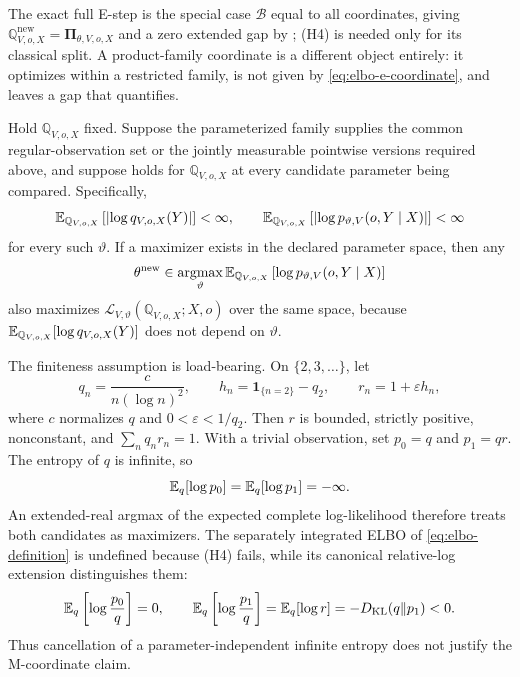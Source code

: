 The exact full E-step is the special case \(\mathcal B\) equal to all coordinates, giving \(\mathbb Q_{V,o,X}^{\mathrm{new}}=\boldsymbol\Pi_{\theta,V,o,X}\) and a zero extended gap by ; (H4) is needed only for its classical split. A product-family coordinate is a different object entirely: it optimizes within a restricted family, is not given by \eqref{eq:elbo-e-coordinate}, and leaves a gap that  quantifies.

Hold \(\mathbb Q_{V,o,X}\) fixed. Suppose the parameterized family supplies the common regular-observation set or the jointly measurable pointwise versions required above, and suppose  holds for \(\mathbb Q_{V,o,X}\) at every candidate parameter being compared. Specifically,
\[
\mathbb E_{\mathbb Q_{V,o,X}}\left[
\left|\log q_{V,o,X}(Y)\right|
\right]<\infty,
\qquad
\mathbb E_{\mathbb Q_{V,o,X}}\left[
\left|\log p_{\vartheta,V}(o,Y\mid X)\right|
\right]<\infty
\]
for every such \(\vartheta\). If a maximizer exists in the declared parameter space, then any
\begin{equation}
\theta^{\mathrm{new}}
\in\operatorname*{argmax}_{\vartheta}
\mathbb E_{\mathbb Q_{V,o,X}}\left[
\log p_{\vartheta,V}(o,Y\mid X)
\right]
\label{eq:elbo-m-coordinate}
\end{equation}
also maximizes \(\mathcal L_{V,\vartheta}(\mathbb Q_{V,o,X};X,o)\) over the same space, because \(\mathbb E_{\mathbb Q_{V,o,X}}[\log q_{V,o,X}(Y)]\) does not depend on \(\vartheta\). 

The finiteness assumption is load-bearing. On \(\{2,3,\ldots\}\), let
\[
q_n=\frac{c}{n(\log n)^2},
\qquad
h_n=\mathbf 1_{\{n=2\}}-q_2,
\qquad
r_n=1+\varepsilon h_n,
\]
where \(c\) normalizes \(q\) and \(0<\varepsilon<1/q_2\). Then \(r\) is bounded, strictly positive, nonconstant, and \(\sum_n q_nr_n=1\). With a trivial observation, set \(p_0=q\) and \(p_1=qr\). The entropy of \(q\) is infinite, so
\[
\mathbb E_q[\log p_0]=\mathbb E_q[\log p_1]=-\infty.
\]
An extended-real argmax of the expected complete log-likelihood therefore treats both candidates as maximizers. The separately integrated ELBO of \eqref{eq:elbo-definition} is undefined because (H4) fails, while its canonical relative-log extension distinguishes them:
\[
\mathbb E_q\left[\log\frac{p_0}{q}\right]=0,
\qquad
\mathbb E_q\left[\log\frac{p_1}{q}\right]
=\mathbb E_q[\log r]
=-D_{\mathrm{KL}}(q\Vert p_1)<0.
\]
Thus cancellation of a parameter-independent infinite entropy does not justify the M-coordinate claim.

